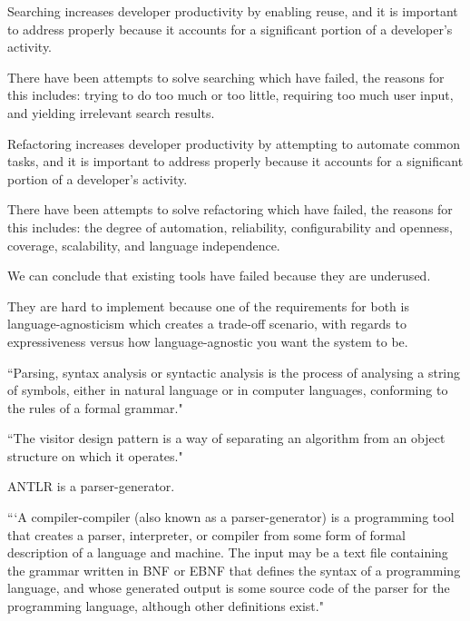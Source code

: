 \documentclass[12pt, letterpaper, oneside]{article}
\begin{document}
Searching increases developer productivity by enabling reuse, and it is important to address properly because it accounts for a significant portion of a developer's activity. \autocite{reiss2009semantics,stolee2014solving}

There have been attempts to solve searching which have failed, the reasons for this includes: trying to do too much or too little, requiring too much user input, and yielding irrelevant search results. \autocite{reiss2009semantics,stolee2014solving}

Refactoring increases developer productivity by attempting to automate common tasks, and it is important to address properly because it accounts for a significant portion of a developer's activity. \autocite{mens2004survey,murphy2012we}

There have been attempts to solve refactoring which have failed, the reasons for this includes: the degree of automation, reliability, configurability and openness, coverage, scalability, and language independence. \autocite{mens2004survey}

We can conclude that existing tools have failed because they are underused. \autocite{murphy2012we}

They are hard to implement because one of the requirements for both is language-agnosticism\autocite{mens2004survey,reiss2009semantics} which creates a trade-off scenario, with regards to expressiveness versus how language-agnostic you want the system to be.

``Parsing, syntax analysis or syntactic analysis is the process of analysing a string of symbols, either in natural language or in computer languages, conforming to the rules of a formal grammar." \autocite{wikipediaparsing}

``The visitor design pattern is a way of separating an algorithm from an object structure on which it operates." \autocite{wikipediavisitorpattern}

ANTLR is a parser-generator. \autocite{wikipediaantlr}

```A compiler-compiler (also known as a parser-generator) is a programming tool that creates a parser, interpreter, or compiler from some form of formal description of a language and machine. The input may be a text file containing the grammar written in BNF or EBNF that defines the syntax of a programming language, and whose generated output is some source code of the parser for the programming language, although other definitions exist." \autocite{wikipediacompilercompiler}
\end{document}
